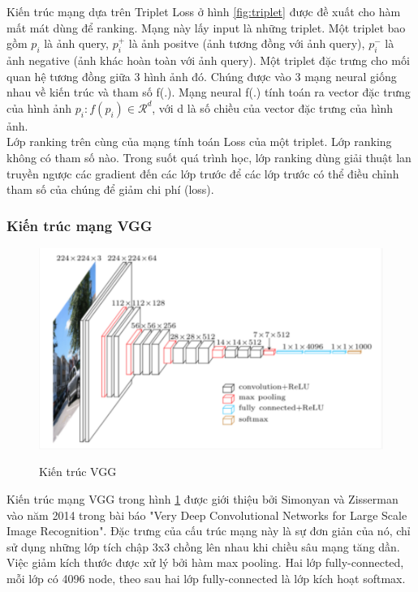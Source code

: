 \documentclass[a4paper,14pt]{extreport}
\begin{document}
Kiến trúc mạng dựa trên Triplet Loss ở hình \ref{fig:triplet} \cite{paper-5} được đề xuất cho hàm mất mát dùng để ranking. Mạng này lấy input là những triplet. Một triplet bao gồm $p_i$ là ảnh query, $p_i^{+}$ là ảnh positve (ảnh tương đồng với ảnh query), $p_i^{-}$ là ảnh negative (ảnh khác hoàn toàn với ảnh query). Một triplet đặc trưng cho mối quan hệ tương đồng giữa 3 hình ảnh đó. Chúng được vào 3 mạng neural giống nhau về kiến trúc và tham số f(.). Mạng neural f(.) tính toán ra vector đặc trưng của hình ảnh $p_i: f(p_i) \in \mathcal{R}^d$, với d là số chiều của vector đặc trưng của hình ảnh.
\\
Lớp ranking trên cùng của mạng tính toán Loss của một triplet. Lớp ranking không có tham số nào. Trong suốt quá trình học, lớp ranking dùng giải thuật lan truyền ngược các gradient đến các lớp trước để các lớp trước có thể điều chỉnh tham số của chúng để giảm chi phí (loss).

\subsubsection*{ Kiến trúc mạng VGG }

\begin{figure}  
    \centering
    \includegraphics[scale=0.8]{img/vgg.png}
    \caption{Kiến trúc VGG}
    \cite{img-vgg}
    \label{fig:vgg}
\end{figure}

Kiến trúc mạng VGG trong hình \ref{fig:vgg} được giới thiệu bởi Simonyan và Zisserman vào năm 2014 trong bài báo "Very Deep Convolutional Networks for Large Scale Image Recognition". Đặc trưng của cấu trúc mạng này là sự đơn giản của nó, chỉ sử dụng những lớp tích chập 3x3 chồng lên nhau khi chiều sâu mạng tăng dần. Việc giảm kích thước được xử lý bởi hàm max pooling. Hai lớp fully-connected, mỗi lớp có 4096 node, theo sau hai lớp fully-connected là lớp kích hoạt softmax.
\end{document}
